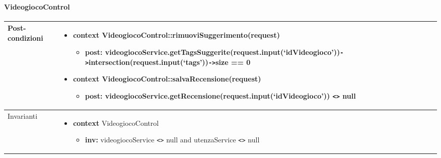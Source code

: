 \newpage
\paragraph{VideogiocoControl}
\small\begin{tabular}{|| l | p{28em} ||} 
\hline
Post-condizioni & \begin{itemize}[leftmargin=*]
	\item \textbf{context} VideogiocoControl::rimuoviSuggerimento(request)
	\begin{itemize}
		\item[ ] \textbf{post:} videogiocoService.getTagsSuggerite(\newline request.input(‘idVideogioco’))\verb|->|intersection(request\newline .input(‘tags’))\verb|->|size == 0
	\end{itemize}

	\item \textbf{context} VideogiocoControl::salvaRecensione(request)
	\begin{itemize}
		\item[ ] \textbf{post:} videogiocoService.getRecensione(request.input(‘idVideogioco’)) \verb|<>| null
	\end{itemize}
\end{itemize}\\
\hline
Invarianti & \begin{itemize}
	\item \textbf{context} VideogiocoControl
	\begin{itemize}
		\item[ ] \textbf{inv:} videogiocoService \verb|<>| null and utenzaService \verb|<>| null
	\end{itemize}
\end{itemize}\\
\hline
\end{tabular}

\newpage
